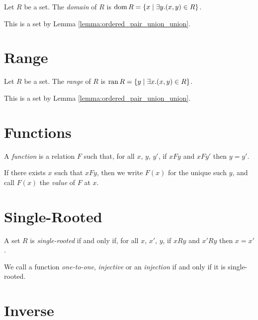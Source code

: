 \begin{definition}
    Let $R$ be a set. The \emph{domain} of $R$ is $\operatorname{dom} R = \{ x \mid \exists y. (x,y) \in R \}$.

    This is a set by Lemma \ref{lemma:ordered_pair_union_union}.
\end{definition}

\section{Range}

\begin{definition}
    Let $R$ be a set. The \emph{range} of $R$ is $\operatorname{ran} R = \{ y \mid \exists x. (x,y) \in R \}$.

    This is a set by Lemma \ref{lemma:ordered_pair_union_union}.
\end{definition}

\section{Functions}

\begin{definition}
A \emph{function} is a relation $F$ such that, for all $x$, $y$, $y'$, if $xFy$ and $xFy'$ then $y = y'$.

If there exists $x$ such that $xFy$, then we write $F(x)$ for the unique such $y$, and call $F(x)$
the \emph{value} of $F$ at $x$.
\end{definition}

\section{Single-Rooted}

\begin{definition}
    A set $R$ is \emph{single-rooted} if and only if, for all $x$, $x'$, $y$, if $xRy$ and $x'Ry$ then $x = x'$.

    We call a function \emph{one-to-one}, \emph{injective} or an \emph{injection}
     if and only if it is single-rooted.
\end{definition}

\section{Inverse}

